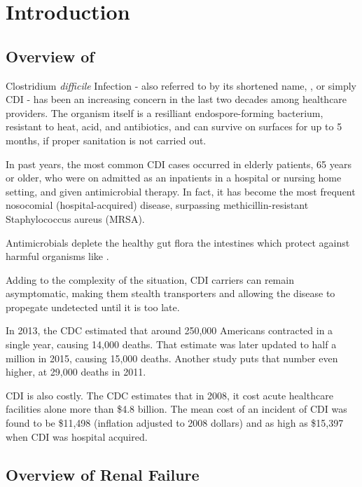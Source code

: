 \chapter{Introduction}

\section{Overview of \cdifficile}

Clostridium \textit{difficile} Infection - also referred to by its shortened name, \cdiff, or simply CDI -
has been an increasing concern in the last two decades among healthcare providers. 
The organism itself is a resilliant endospore-forming bacterium, resistant to heat, acid, and antibiotics,
and can survive on surfaces for up to 5 months, if proper sanitation is not carried out. \cite{Gerding2008}

In past years, the most common CDI cases occurred in elderly patients, 65 years or older,
who were on admitted as an inpatients in a hospital or nursing home setting, and given antimicrobial therapy.
In fact, it has become the most frequent nosocomial (hospital-acquired) disease, surpassing
methicillin-resistant Staphylococcus aureus (MRSA). \cite{Gupta2014}

Antimicrobials deplete the healthy gut flora the intestines which protect against harmful organisms like \cdiff. \cite{Lamont2017}

Adding to the complexity of the situation, CDI carriers can remain asymptomatic, making them stealth transporters
and allowing the disease to propegate undetected until it is too late. 

In 2013, the CDC estimated that around 250,000 Americans contracted \cdiff in a single year, causing 14,000 deaths.
That estimate was later updated to half a million in 2015, causing 15,000 deaths. \cite{CDC2018}
\cite{CDC2015} 
Another study puts that number even higher, at 29,000 deaths in 2011. 

CDI is also costly. The CDC estimates that in 2008, it cost acute healthcare facilities alone more than \$4.8 billion.
The mean cost of an incident of CDI was found to be \$11,498 (inflation adjusted to 2008 dollars)
and as high as \$15,397 when CDI was hospital acquired. \cite{Dubberke2012}


\section{Overview of Renal Failure}

